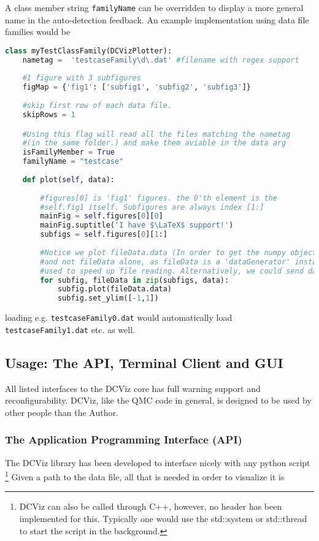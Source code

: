 A class member string \verb+familyName+ can be overridden to display a more general name in the auto-detection feedback. An example implementation using data file families would be
\vspace{0.5cm}
\begin{lstlisting}[language=Python]
class myTestClassFamily(DCVizPlotter):
    nametag =  'testcaseFamily\d\.dat' #filename with regex support
    
    #1 figure with 3 subfigures
    figMap = {'fig1': ['subfig1', 'subfig2', 'subfig3']}
    
    #skip first row of each data file.
    skipRows = 1    

    #Using this flag will read all the files matching the nametag
    #(in the same folder.) and make them aviable in the data arg    
    isFamilyMember = True
    familyName = "testcase"
    
    def plot(self, data):
        
        #figures[0] is 'fig1' figures. the 0'th element is the
        #self.fig1 itself. Subfigures are always index [1:]
        mainFig = self.figures[0][0]  
        mainFig.suptitle('I have $\LaTeX$ support!')        
        subfigs = self.figures[0][1:]
    
        #Notice we plot fileData.data (In order to get the numpy object) 
        #and not fileData alone, as fileData is a 'dataGenerator' instance 
        #used to speed up file reading. Alternatively, we could send data[:]
        for subfig, fileData in zip(subfigs, data):
            subfig.plot(fileData.data)
            subfig.set_ylim([-1,1])
\end{lstlisting}

loading e.g. \verb+testcaseFamily0.dat+ would automatically load \verb+testcaseFamily1.dat+ etc. as well.

\subsection{Usage: The API, Terminal Client and GUI}

All listed interfaces to the DCViz core has full warning support and reconfigurability. DCViz, like the QMC code in general, is designed to be used by other people than the Author.

\subsubsection{The Application Programming Interface (API)}
The DCViz library has been developed to interface nicely with any python script \footnote{DCViz can also be called through C++, however, no header has been implemented for this. Typically one would use the std::system or std::thread to start the script in the background.} Given a path to the data file, all that is needed in order to visualize it is


